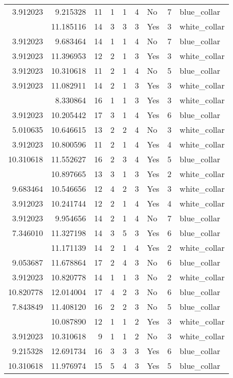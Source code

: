 \documentclass[
]{article}
\begin{document}
\begin{longtable}[t]{rrrrrllrl}
3.912023 & 9.215328 & 11 & 1 & 1 & 4 & No & 7 & blue\_collar\\
\addlinespace
7.130899 & 11.185116 & 14 & 3 & 3 & 3 & Yes & 3 & white\_collar\\
3.912023 & 9.683464 & 14 & 1 & 1 & 4 & No & 7 & blue\_collar\\
3.912023 & 11.396953 & 12 & 2 & 1 & 3 & Yes & 3 & white\_collar\\
3.912023 & 10.310618 & 11 & 2 & 1 & 4 & No & 5 & blue\_collar\\
3.912023 & 11.082911 & 14 & 2 & 1 & 3 & Yes & 3 & white\_collar\\
\addlinespace
3.912023 & 8.330864 & 16 & 1 & 1 & 3 & Yes & 3 & white\_collar\\
3.912023 & 10.205442 & 17 & 3 & 1 & 4 & Yes & 6 & blue\_collar\\
5.010635 & 10.646615 & 13 & 2 & 2 & 4 & No & 3 & white\_collar\\
3.912023 & 10.800596 & 11 & 2 & 1 & 4 & Yes & 4 & white\_collar\\
10.310618 & 11.552627 & 16 & 2 & 3 & 4 & Yes & 5 & blue\_collar\\
\addlinespace
3.912023 & 10.897665 & 13 & 3 & 1 & 3 & Yes & 2 & white\_collar\\
9.683464 & 10.546656 & 12 & 4 & 2 & 3 & Yes & 3 & white\_collar\\
3.912023 & 10.241744 & 12 & 2 & 1 & 4 & Yes & 4 & white\_collar\\
3.912023 & 9.954656 & 14 & 2 & 1 & 4 & No & 7 & blue\_collar\\
7.346010 & 11.327198 & 14 & 3 & 5 & 3 & Yes & 6 & blue\_collar\\
\addlinespace
3.912023 & 11.171139 & 14 & 2 & 1 & 4 & Yes & 2 & white\_collar\\
9.053687 & 11.678864 & 17 & 2 & 4 & 3 & No & 6 & blue\_collar\\
3.912023 & 10.820778 & 14 & 1 & 1 & 3 & No & 2 & white\_collar\\
10.820778 & 12.014004 & 17 & 4 & 2 & 3 & No & 6 & blue\_collar\\
7.843849 & 11.408120 & 16 & 2 & 2 & 3 & No & 5 & blue\_collar\\
\addlinespace
3.912023 & 10.087890 & 12 & 1 & 1 & 2 & Yes & 3 & white\_collar\\
3.912023 & 10.310618 & 9 & 1 & 1 & 2 & No & 3 & white\_collar\\
9.215328 & 12.691734 & 16 & 3 & 3 & 3 & Yes & 6 & blue\_collar\\
10.310618 & 11.976974 & 15 & 5 & 4 & 3 & Yes & 5 & blue\_collar\\

\end{longtable}
\end{document}
